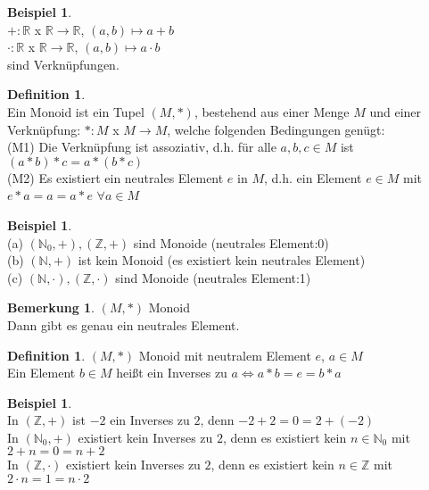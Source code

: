 \documentclass[10pt,a4paper,numbers=endperiod]{scrartcl}
\theoremstyle{definition}
\newtheorem{defi}[satz]{Definition}
\newtheorem{bem}[satz]{Bemerkung}
\newtheorem{bsp}[satz]{Beispiel}
\begin{document}
\begin{bsp}
	$ $ \\
	$+: \mathbb{R}$ x $\mathbb{R} \rightarrow \mathbb{R}$, $(a,b) \mapsto a+b$\\
	$\cdot: \mathbb{R}$ x $\mathbb{R} \rightarrow \mathbb{R}$, $(a,b) \mapsto a \cdot b$\\
	sind Verknüpfungen. 
\end{bsp}

\begin{defi}
	$ $\\
	Ein Monoid ist ein Tupel $(M,*)$, bestehend aus einer Menge $M$ und einer Verknüpfung: $*: M$ x $M \rightarrow M$, welche folgenden Bedingungen genügt:\\
	(M1) Die Verknüpfung ist assoziativ, d.h. für alle $a,b,c \in M$ ist $(a*b)*c = a*(b*c)$\\
	(M2) Es existiert ein neutrales Element $e$ in $M$, d.h. ein Element $e \in M$ mit $e*a = a = a*e$ $\forall a \in M$ 
\end{defi}

\begin{bsp}
	$ $ \\
	(a) $(\mathbb{N}_0, +), (\mathbb{Z}, +)$ sind Monoide (neutrales Element:$0$)\\
	(b) $(\mathbb{N}, +)$ ist kein Monoid (es existiert kein neutrales Element)\\
	(c) $(\mathbb{N},\cdot), (\mathbb{Z}, \cdot)$ sind Monoide (neutrales Element:1)
\end{bsp}

\begin{bem}
	$(M, *)$ Monoid\\
	Dann gibt es genau ein neutrales Element.
\end{bem}

\begin{defi}
	$(M, *)$ Monoid mit neutralem Element $e$, $a \in M$\\
	Ein Element $b \in M$ heißt ein Inverses zu $a \Leftrightarrow a*b=e=b*a$
\end{defi}

\begin{bsp}
	$ $ \\
	In $(\mathbb{Z},+)$ ist $-2$ ein Inverses zu $2$, denn $-2+2=0=2+(-2)$\\
	In $(\mathbb{N}_0, +)$ existiert kein Inverses zu $2$, denn es existiert kein $n \in \mathbb{N}_0$ mit $2+n=0=n+2$\\
	In $(\mathbb{Z}, \cdot)$ existiert kein Inverses zu $2$, denn es existiert kein $n \in \mathbb{Z}$ mit $2 \cdot n = 1 = n \cdot 2$
\end{bsp}
\end{document}
